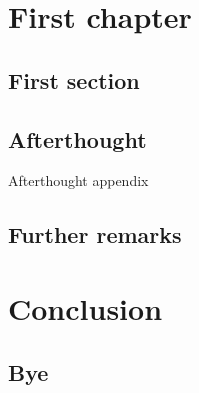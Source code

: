 \documentclass[oneside]{memoir}
\begin{document}
\dominitoc
\tableofcontents
\adjustmtc
\chapter{First chapter}
\minitoc
\lipsum[1]
\section{First section}
\lipsum[2]
\begin{appendices}
\addappheadtotoc
\chapter{Afterthought}
\minitoc
\lipsum[3]
Afterthought appendix
\section{Further remarks}
\lipsum[4]
\end{appendices}
\chapter{Conclusion}
\minitoc
\section{Bye}
\lipsum[5]
\end{document}
